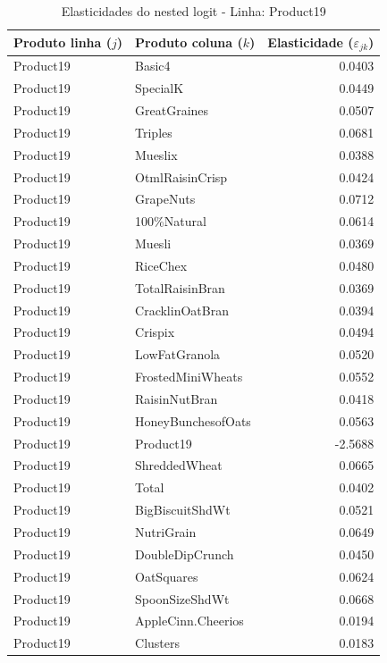 
\begingroup
\begin{table}[H]
\centering
\caption{Elasticidades do nested logit - Linha: Product19}
\label{tab:elas-nested-product19}
\small
\begin{tabular}{llr}
\toprule
Produto linha ($j$) & Produto coluna ($k$) & Elasticidade ($\varepsilon_{jk}$) \\
\midrule
Product19 & Basic4 & 0.0403 \\
Product19 & SpecialK & 0.0449 \\
Product19 & GreatGraines & 0.0507 \\
Product19 & Triples & 0.0681 \\
Product19 & Mueslix & 0.0388 \\
Product19 & OtmlRaisinCrisp & 0.0424 \\
Product19 & GrapeNuts & 0.0712 \\
Product19 & 100\%Natural & 0.0614 \\
Product19 & Muesli & 0.0369 \\
Product19 & RiceChex & 0.0480 \\
Product19 & TotalRaisinBran & 0.0369 \\
Product19 & CracklinOatBran & 0.0394 \\
Product19 & Crispix & 0.0494 \\
Product19 & LowFatGranola & 0.0520 \\
Product19 & FrostedMiniWheats & 0.0552 \\
Product19 & RaisinNutBran & 0.0418 \\
Product19 & HoneyBunchesofOats & 0.0563 \\
Product19 & Product19 & -2.5688 \\
Product19 & ShreddedWheat & 0.0665 \\
Product19 & Total & 0.0402 \\
Product19 & BigBiscuitShdWt & 0.0521 \\
Product19 & NutriGrain & 0.0649 \\
Product19 & DoubleDipCrunch & 0.0450 \\
Product19 & OatSquares & 0.0624 \\
Product19 & SpoonSizeShdWt & 0.0668 \\
Product19 & AppleCinn.Cheerios & 0.0194 \\
Product19 & Clusters & 0.0183 \\

\end{tabular}
\end{table}
